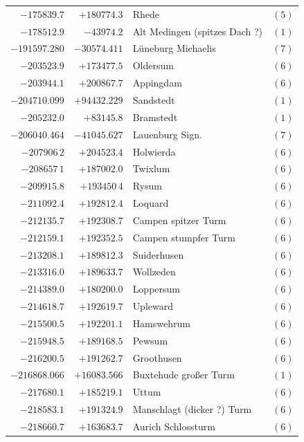 \begin{center}
\begin{tabular}{r|r|p{170pt}|r}
\(-175839.7\)&\(+180774.3\)&Rhede&\((5)\)\\
\(-178512.9\)&\(-43974.2\)&Alt Medingen (spitzes Dach ?)&\((1)\)\\
\(-191597.280\)&\(-30574.411\)&Lüneburg Michaelis&\((7)\)\\
\(-203523.9\)&\(+173477.5\)&Oldersum&\((6)\)\\
\(-203944.1\)&\(+200867.7\)&Appingdam&\((6)\)\\
\(-204710.099\)&\(+94432.229\)&Sandstedt&\((1)\)\\
\(-205232.0\)&\(+83145.8\)&Bramstedt&\((1)\)\\
\(-206040.464\)&\(-41045.627\)&Lauenburg Sign.&\((7)\)\\
\(-207906\,2\)&\(+204523.4\)&Holwierda&\((6)\)\\
\(-208657\,1\)&\(+187002.0\)&Twixlum&\((6)\)\\
\(-209915.8\)&\(+193450\,4\)&Rysum&\((6)\)\\
\(-211092.4\)&\(+192812.4\)&Loquard&\((6)\)\\
\(-212135.7\)&\(+192308.7\)&Campen spitzer Turm&\((6)\)\\
\(-212159.1\)&\(+192352.5\)&Campen stumpfer Turm&\((6)\)\\
\(-213208.1\)&\(+189812.3\)&Suiderhusen&\((6)\)\\
\(-213316.0\)&\(+189633.7\)&Wollzeden&\((6)\)\\
\(-214389.0\)&\(+180200.0\)&Loppersum&\((6)\)\\
\(-214618.7\)&\(+192619.7\)&Upleward&\((6)\)\\
\(-215500.5\)&\(+192201.1\)&Hamswehrum&\((6)\)\\
\(-215948.5\)&\(+189168.5\)&Pewsum&\((6)\)\\
\(-216200.5\)&\(+191262.7\)&Groothusen&\((6)\)\\
\(-216868.066\)&\(+16083.566\)&Buxtehude großer Turm&\((1)\)\\
\(-217680.1\)&\(+185219.1\)&Uttum&\((6)\)\\
\(-218583.1\)&\(+191324.9\)&Manschlagt (dicker ?) Turm&\((6)\)\\
\(-218660.7\)&\(+163683.7\)&Aurich Schlossturm&\((6)\)\\
\hline\end{tabular}\endgroup\end{center}
\clearpage
